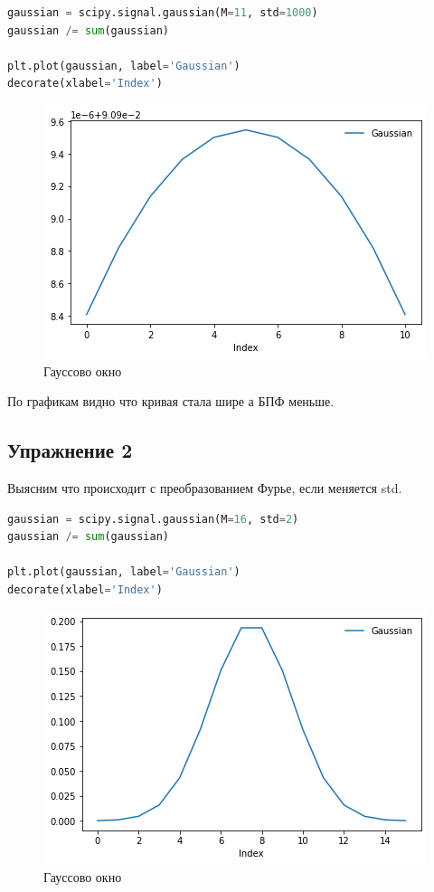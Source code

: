 \begin{lstlisting}[language=Python]
gaussian = scipy.signal.gaussian(M=11, std=1000)
gaussian /= sum(gaussian)

plt.plot(gaussian, label='Gaussian')
decorate(xlabel='Index')
\end{lstlisting}
\begin{figure}[H]
	\begin{center}
		\includegraphics[scale=0.7]{fig/lab08/lab08_3.png}
		\caption{Гауссово окно}
	\end{center}
\end{figure}

По графикам видно что кривая стала шире а БПФ меньше.

\subsection{Упражнение 2}

Выясним что происходит с преобразованием Фурье, если меняется std.

\begin{lstlisting}[language=Python]
gaussian = scipy.signal.gaussian(M=16, std=2)
gaussian /= sum(gaussian)

plt.plot(gaussian, label='Gaussian')
decorate(xlabel='Index')
\end{lstlisting}
\begin{figure}[H]
	\begin{center}
		\includegraphics[scale=0.7]{fig/lab08/lab08_4.png}
		\caption{Гауссово окно}
	\end{center}
\end{figure}

